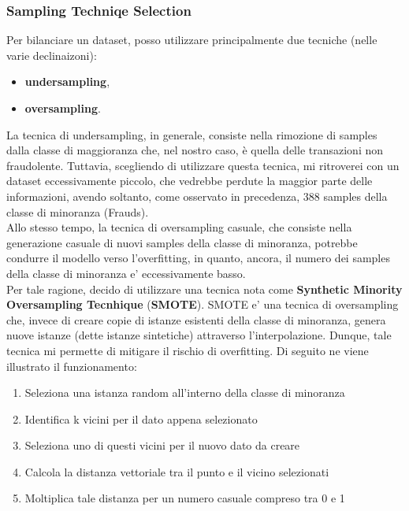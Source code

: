 \documentclass[]{article}
\begin{document}
        \subsubsection{Sampling Techniqe Selection}
            Per bilanciare un dataset, posso utilizzare principalmente due tecniche (nelle varie declinaizoni):
            \begin{itemize}
                \item \textbf{undersampling},
                \item \textbf{oversampling}.
            \end{itemize}
            La tecnica di undersampling, in generale, consiste nella rimozione di samples dalla classe di maggioranza che, nel nostro caso, è quella delle transazioni non fraudolente. Tuttavia, scegliendo di utilizzare questa tecnica, mi ritroverei con un dataset eccessivamente piccolo, che vedrebbe perdute la maggior parte delle informazioni, avendo soltanto, come osservato in precedenza, 388 samples della classe di minoranza (Frauds).\\
            Allo stesso tempo, la tecnica di oversampling casuale, che consiste nella generazione casuale di nuovi samples della classe di minoranza, potrebbe condurre il modello verso l'overfitting, in quanto, ancora, il numero dei samples della classe di minoranza e' eccessivamente basso.\\
            Per tale ragione, decido di utilizzare una tecnica nota come \textbf{Synthetic Minority Oversampling Tecnhique} (\textbf{SMOTE}).
            SMOTE e' una tecnica di oversampling che, invece di creare copie di istanze esistenti della classe di minoranza, genera nuove istanze (dette istanze sintetiche) attraverso l'interpolazione. Dunque, tale tecnica mi permette di mitigare il rischio di overfitting. Di seguito ne viene illustrato il funzionamento:
            \begin{enumerate}
                \item Seleziona una istanza random all'interno della classe di minoranza
                \item Identifica k vicini per il dato appena selezionato
                \item Seleziona uno di questi vicini per il nuovo dato da creare
                \item Calcola la distanza vettoriale tra il punto e il vicino selezionati
                \item Moltiplica tale distanza per un numero casuale compreso tra 0 e 1
            \end{enumerate}
\end{document}

